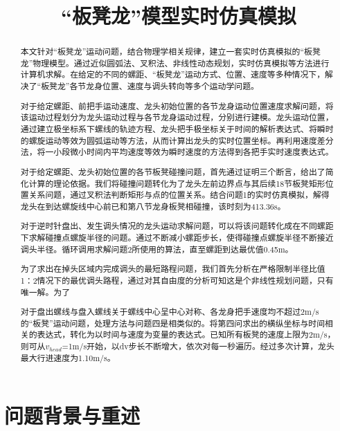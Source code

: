 \documentclass{cumcmthesis1}
\title{“板凳龙”模型实时仿真模拟}
\begin{document}
 \maketitle
 \begin{abstract}
 本文针对“板凳龙”运动问题，结合物理学相关规律，建立一套实时仿真模拟的“板凳龙”物理模型。通过近似圆弧法、叉积法、非线性动态规划，实时仿真模拟等方法进行计算机求解。在给定的不同的螺距、“板凳龙”运动方式、位置、速度等多种情况下，解决了“板凳龙”各节龙身位置、速度与调头转向等多个运动学问题。
 \par
 对于给定螺距、前把手运动速度、龙头初始位置的各节龙身运动位置速度求解问题，将该运动过程划分为龙头运动过程与各节龙身运动过程，分别进行建模。龙头运动位置，通过建立极坐标系下螺线的轨迹方程、龙头把手极坐标关于时间的解析表达式、将瞬时的螺旋运动等效为圆弧运动等方法，从而计算出龙头的实时位置坐标。再利用速度差分法，将一小段微小时间内平均速度等效为瞬时速度的方法得到各把手实时速度表达式。
 \par
 对于给定螺距、龙头初始位置的各节板凳碰撞问题，首先通过证明三个断言，给出了简化计算的理论依据。我们将碰撞问题转化为了龙头左前边界点与其后续18节板凳矩形位置关系问题，通过叉积法判断矩形与点的位置关系。结合问题1的实时仿真模拟，解得龙头在到达螺旋线中心前已和第八节龙身板凳相碰撞，该时刻为413.36s。
 \par
 对于逆时针盘出、发生调头情况的龙头运动求解问题，可以将该问题转化成在不同螺距下求解碰撞点螺旋半径的问题。通过不断减小螺距步长，使得碰撞点螺旋半径不断接近调头半径。循环调用求解问题2所使用的算法，直至螺距到达最优值0.45m。
 \par
为了求出在掉头区域内完成调头的最短路程问题，我们首先分析在严格限制半径比值1：2情况下的最优调头路程，通过对其自由度的分析可知这是个非线性规划问题，只有唯一解。为了
 \par
对于盘出螺线与盘入螺线关于螺线中心呈中心对称、各龙身把手速度均不超过2m/s的“板凳”运动问题，处理方法与问题四是相类似的。将第四问求出的横纵坐标与时间相关的表达式，转化为以时间与速度为变量的表达式。已知所有板凳的速度上限为2m/s，则可从$v_{head}$=1m/s开始，以dv步长不断增大，依次对每一秒遍历。经过多次计算，龙头最大行进速度为1.10m/s。
 

\end{abstract}
\section{问题背景与重述}
\end{document}
